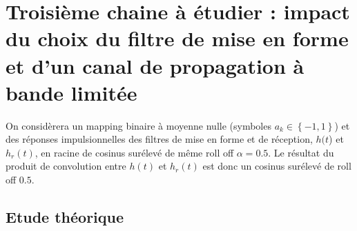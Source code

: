 \documentclass[frenchb]{article}
\begin{document}
\section{Troisième chaine à étudier : impact du choix du filtre de mise en forme et d'un canal de propagation à bande limitée}
On considèrera un mapping binaire à moyenne nulle (symboles $a_k \in \left\{-1,1\right\}$) et des réponses impulsionnelles des filtres de mise en forme et de réception, $h(t$) et $h_r(t)$, en racine de cosinus surélevé de même roll off $\alpha=0.5$. Le résultat du produit de convolution entre $h(t)$ et $h_r(t)$ est donc un cosinus surélevé de roll off $0.5$.

\subsection{Etude théorique}
\end{document}
